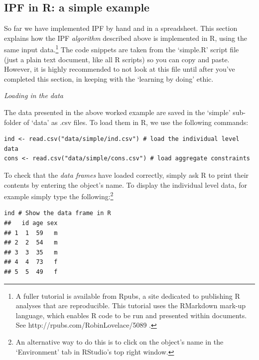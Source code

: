 \documentclass[a4paper, 11pt, twoside]{article}
\begin{document}
\subsection{IPF in R: a simple example} \label{simplementing}
So far we have implemented IPF by hand and in a spreadsheet.
This section explains how the IPF
\emph{algorithm} described above is implemented in R, using the
same input data.\footnote{A fuller tutorial is available from Rpubs, a site dedicated
to publishing R analyses that are reproducible. This tutorial uses the RMarkdown
mark-up language, which enables R code to be run and presented within
documents. See http://rpubs.com/RobinLovelace/5089 \label{fnrpub} .}
The code snippets are taken from the `simple.R' script file (just a plain text
document, like all R scripts) so you can copy and paste. However, it is
highly recommended to not look at this file until after you've completed this
section, in keeping with the `learning by doing' ethic.

\emph{Loading in the data}

The data presented in the above worked example are saved in the
`simple' sub-folder of `data' as .csv files. To load them in R,
we use the following commands:

\begin{lstlisting}[float=h, caption={Loading the input data in R}, label=cusd]
ind <- read.csv("data/simple/ind.csv") # load the individual level data
cons <- read.csv("data/simple/cons.csv") # load aggregate constraints
\end{lstlisting}

To check that the \emph{data frames} have loaded correctly, simply
ask R to print their contents by entering the object's name. To display the
individual level data, for example simply type the
following:\footnote{An alternative
way to do this is to click on the object's name in the `Environment' tab in
RStudio's top right window.}

\begin{lstlisting}[float=h, caption={Checking the contents of the individual
level data frame}, label=cout]
ind # Show the data frame in R
##   id age sex
## 1  1  59   m
## 2  2  54   m
## 3  3  35   m
## 4  4  73   f
## 5  5  49   f
\end{lstlisting}
\end{document}
